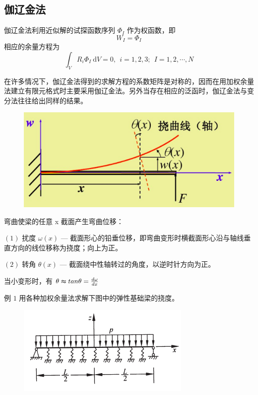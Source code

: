 \documentclass[12pt,a4paper]{article}
\begin{document}
\subsection{伽辽金法}
伽辽金法利用近似解的试探函数序列 $\Phi _I$ 作为权函数，即
\begin{equation}
W_I=\Phi _I
\end{equation}
相应的余量方程为
\begin{equation}
\int_{V} R_i\Phi _I ~ \mathrm{d}V=0,~~i=1,2,3;~~I=1,2,\cdots ,N
\end{equation}

在许多情况下，伽辽金法得到的求解方程的系数矩阵是对称的，因而在用加权余量法建立有限元格式时主要采用伽辽金法。另外当存在相应的泛函时，伽辽金法与变分法往往给出同样的结果。

\begin{figure}[H]
\centering
\includegraphics[scale=0.5]{./figures/2.png}
\caption{}
\end{figure}

弯曲使梁的任意 x 截面产生弯曲位移：

$(1)$ 扰度 $\omega(x)$ — 截面形心的铅垂位移，即弯曲变形时横截面形心沿与轴线垂直方向的线位移称为挠度；向上为正。

$(2)$ 转角 $\theta(x)$ — 截面绕中性轴转过的角度，以逆时针方向为正。

当小变形时，有 $\theta\thickapprox tan\theta =\frac{d\omega}{dx}$

例 $1$ 用各种加权余量法求解下图中的弹性基础梁的挠度。
\begin{figure}[H]
\centering
\includegraphics[scale=0.6]{./figures/1.png}
\caption{}
\end{figure}
\end{document}
